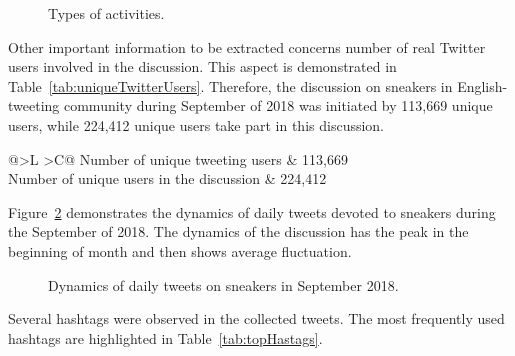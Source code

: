 \begin{figure}[ht]
	\caption{Types of activities.}\label{fig:activityTypes}
\end{figure}

Other important information to be extracted concerns number of real Twitter users involved in the discussion. This aspect is demonstrated in Table~\cref{tab:uniqueTwitterUsers}. Therefore, the discussion on sneakers in English-tweeting community during September of 2018 was initiated by 113,669 unique users, while 224,412 unique users take part in this discussion.

\begin{table} [htbp]%
	\centering
	\caption{Unique Twitter users.}%
	\label{tab:uniqueTwitterUsers}%
	\renewcommand{\arraystretch}{1.6}%
	\begin{tabulary}{\textwidth}{@{}>{\zz}L >{\zz}C@{}}%
		\toprule     %
		Number of unique tweeting users & 113,669 \\ 
		Number of unique users in the discussion & 224,412  \\
		\bottomrule %
	\end{tabulary}%
\end{table}

Figure~\cref{fig:dailyTweetDynamics} demonstrates the dynamics of daily tweets devoted to sneakers during the September of 2018. The dynamics of the discussion has the peak in the beginning of month and then shows average fluctuation.

\begin{figure}[ht]
	\caption{Dynamics of daily tweets on sneakers in September 2018.}\label{fig:dailyTweetDynamics}
\end{figure}

Several hashtags were observed in the collected tweets. The most frequently used hashtags are highlighted in Table~\cref{tab:topHastags}.


